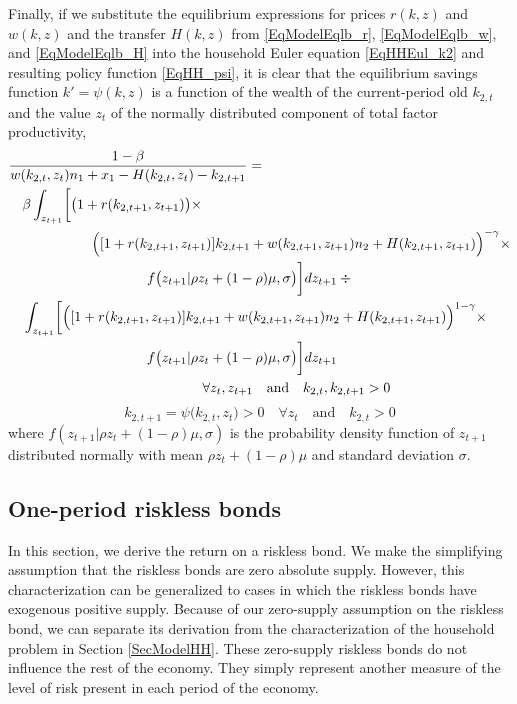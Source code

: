\documentclass[letterpaper,12pt]{article}
\theoremstyle{definition}
\begin{document}
\begin{spacing}{1.5}
    Finally, if we substitute the equilibrium expressions for prices $r(k,z)$ and $w(k,z)$ and the transfer $H(k,z)$ from \eqref{EqModelEqlb_r}, \eqref{EqModelEqlb_w}, and \eqref{EqModelEqlb_H} into the household Euler equation \eqref{EqHHEul_k2} and resulting policy function \eqref{EqHH_psi}, it is clear that the equilibrium savings function $k'=\psi(k,z)$ is a function of the wealth of the current-period old $k_{2,t}$ and the value $z_t$ of the normally distributed component of total factor productivity,
    \begin{equation}\label{EqModelEqlb_Eul}
      \begin{split}
        &\frac{1-\beta}{w(k_{2,t},z_t) n_1 + x_1 - H(k_{2,t},z_t) - k_{2,t+1}} = \\
        & \quad\beta\int_{z_{t+1}}\biggl[\bigl(1+r(k_{2,t+1},z_{t+1})\bigr)\times \\
        &\qquad\qquad\qquad \Bigl([1 + r(k_{2,t+1},z_{t+1})]k_{2,t+1} + w(k_{2,t+1},z_{t+1})n_2 + H(k_{2,t+1},z_{t+1})\Bigr)^{-\gamma}\times \\
        &\qquad\qquad\qquad\qquad\qquad f\bigl(z_{t+1}|\rho z_t + (1 - \rho)\mu, \sigma\bigr)\biggr]dz_{t+1} \:\div \\
        & \quad\int_{z_{t+1}}\biggl[\Bigl([1 + r(k_{2,t+1},z_{t+1})]k_{2,t+1} + w(k_{2,t+1},z_{t+1})n_2 + H(k_{2,t+1},z_{t+1})\Bigr)^{1-\gamma}\times \\
        &\qquad\qquad\qquad\qquad\qquad f\bigl(z_{t+1}|\rho z_t + (1 - \rho)\mu, \sigma\bigr)\biggr]dz_{t+1} \\
        &\qquad\qquad\qquad\qquad\qquad\qquad\qquad \forall z_t, z_{t+1} \quad\text{and}\quad k_{2,t}, k_{2,t+1}>0
      \end{split}
    \end{equation}
    \begin{equation}\label{EqModelEqlb_psi}
      k_{2,t+1} = \psi\bigl(k_{2,t},z_t\bigr)>0 \quad\forall z_t \quad\text{and}\quad k_{2,t}>0
    \end{equation}
    where $f(z_{t+1}|\rho z_t + (1-\rho)\mu,\sigma)$ is the probability density function of $z_{t+1}$ distributed normally with mean $\rho z_t + (1-\rho)\mu$ and standard deviation $\sigma$.


  \subsection{One-period riskless bonds}\label{SecModelRiskless}

    In this section, we derive the return on a riskless bond. We make the simplifying assumption that the riskless bonds are zero absolute supply. However, this characterization can be generalized to cases in which the riskless bonds have exogenous positive supply. Because of our zero-supply assumption on the riskless bond, we can separate its derivation from the characterization of the household problem in Section \ref{SecModelHH}. These zero-supply riskless bonds do not influence the rest of the economy. They simply represent another measure of the level of risk present in each period of the economy.


\end{spacing}
\end{document}
